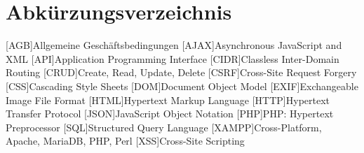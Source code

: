 \chapter*{Abk\"urzungsverzeichnis}

\begin{acronym}[XAMPP]
[AGB]{Allgemeine Gesch\"aftsbedingungen}
[AJAX]{Asynchronous JavaScript and XML}
[API]{Application Programming Interface}
[CIDR]{Classless Inter-Domain Routing}
[CRUD]{Create, Read, Update, Delete}
[CSRF]{Cross-Site Request Forgery}
[CSS]{Cascading Style Sheets}
[DOM]{Document Object Model}
[EXIF]{Exchangeable Image File Format}
[HTML]{Hypertext Markup Language}
[HTTP]{Hypertext Transfer Protocol}
[JSON]{JavaScript Object Notation}
[PHP]{PHP: Hypertext Preprocessor}
[SQL]{Structured Query Language}
[XAMPP]{Cross-Platform, Apache, MariaDB, PHP, Perl}
[XSS]{Cross-Site Scripting}
\end{acronym}
